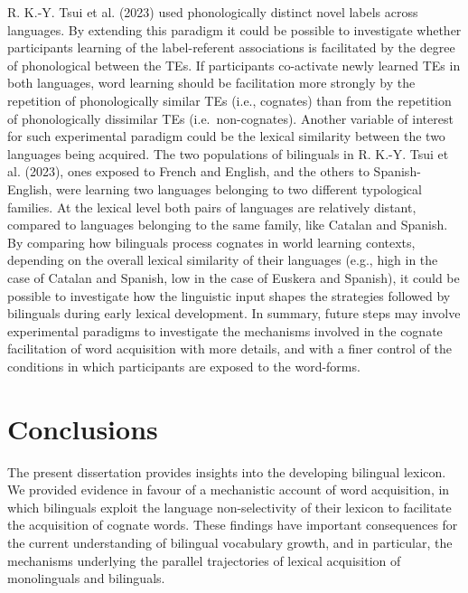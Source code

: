 \documentclass[
  12pt,
  b5paperpaper,
  twoside]{scrreprt}
\begin{document}
R. K.-Y. Tsui et al. (2023) used phonologically distinct novel labels
across languages. By extending this paradigm it could be possible to
investigate whether participants learning of the label-referent
associations is facilitated by the degree of phonological between the
TEs. If participants co-activate newly learned TEs in both languages,
word learning should be facilitation more strongly by the repetition of
phonologically similar TEs (i.e., cognates) than from the repetition of
phonologically dissimilar TEs (i.e.~non-cognates). Another variable of
interest for such experimental paradigm could be the lexical similarity
between the two languages being acquired. The two populations of
bilinguals in R. K.-Y. Tsui et al. (2023), ones exposed to French and
English, and the others to Spanish-English, were learning two languages
belonging to two different typological families. At the lexical level
both pairs of languages are relatively distant, compared to languages
belonging to the same family, like Catalan and Spanish. By comparing how
bilinguals process cognates in world learning contexts, depending on the
overall lexical similarity of their languages (e.g., high in the case of
Catalan and Spanish, low in the case of Euskera and Spanish), it could
be possible to investigate how the linguistic input shapes the
strategies followed by bilinguals during early lexical development. In
summary, future steps may involve experimental paradigms to investigate
the mechanisms involved in the cognate facilitation of word acquisition
with more details, and with a finer control of the conditions in which
participants are exposed to the word-forms.

\hypertarget{conclusions}{%
\section{Conclusions}\label{conclusions}}

The present dissertation provides insights into the developing bilingual
lexicon. We provided evidence in favour of a mechanistic account of word
acquisition, in which bilinguals exploit the language non-selectivity of
their lexicon to facilitate the acquisition of cognate words. These
findings have important consequences for the current understanding of
bilingual vocabulary growth, and in particular, the mechanisms
underlying the parallel trajectories of lexical acquisition of
monolinguals and bilinguals.

\clearpage

\end{document}
